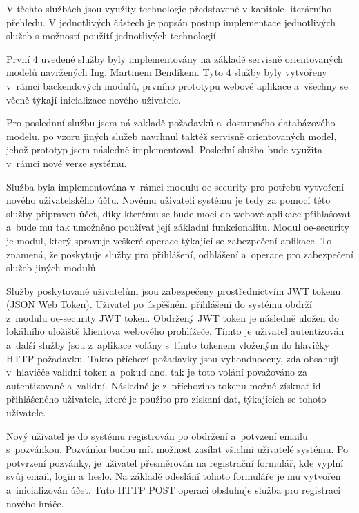 \documentclass[12pt]{article}
\begin{document}
{V těchto službách jsou využity technologie představené v kapitole literárního přehledu.
V jednotlivých částech je popsán postup implementace jednotlivých služeb s možností použití jednotlivých technologií.

První 4 uvedené služby byly implementovány na základě servisně orientovaných modelů navržených Ing. Martinem Bendíkem.
Tyto 4 služby byly vytvořeny v~rámci backendových modulů, prvního prototypu webové aplikace
a~všechny se věcně týkají inicializace nového uživatele.

Pro poslednní službu jsem ná zakladě požadavků a~dostupného databázového modelu,
po vzoru jiných služeb  navrhnul taktéž servisně orientovaných model,
jehož prototyp jsem následně implementoval.
Poslední služba bude využita v~rámci nové verze systému.

\clearpage


Služba byla implementována v~rámci modulu oe-security pro potřebu vytvoření nového uživatelského účtu.
Novému uživateli systému je tedy za pomocí této služby připraven účet,
díky kterému se bude moci do webové aplikace přihlašovat a~bude mu tak umožněno používat její základní funkcionalitu.
Modul oe-security je modul, který spravuje veškeré operace týkající se zabezpečení aplikace.
To znamená, že poskytuje služby pro přihlášení, odhlášení a~operace pro zabezpečení služeb jiných modulů.

Služby poskytované uživatelům jsou zabezpečeny prostřednictvím JWT tokenu (JSON Web Token).
Uživatel po úspěšném přihlášení do systému obdrží z~modulu oe-security JWT token.
Obdržený JWT token je následně uložen do lokálního uložiště klientova webového prohlížeče. 
Tímto je uživatel autentizován a~další služby jsou z~aplikace volány s~tímto tokenem vloženým do hlavičky HTTP požadavku. 
Takto příchozí požadavky jsou vyhondnoceny, zda obsahují v~hlavičče validní token a~pokud ano, 
tak je toto volání považováno za autentizované a~validní. Následně je z~příchozího tokenu možné získnat id přihlášeného uživatele,
které je použito pro získaní dat, týkajících se tohoto uživatele.

Nový uživatel je do systému registrován po obdržení a~potvzení emailu s~pozvánkou.
Pozvánku budou mít možnost zasílat všichni uživatelé systému.
Po potvrzení pozvánky, je uživatel přesměrován na registrační
formulář, kde vyplní svůj email, login a~heslo. 
Na základě odeslání tohoto formuláře je mu vytvořen a~inicializován účet. 
Tuto HTTP POST operaci obsluhuje služba pro registraci nového hráče.

}
\end{document}

